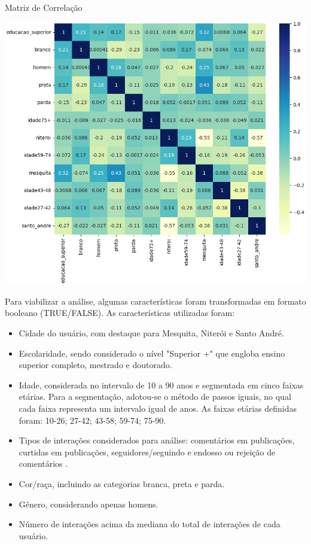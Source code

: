 \begin{quadro}[!htb]
	\caption{Matriz de Correlação}
	\label{fig:colab_correlation_matrix}
	\centering
	\includegraphics[scale=0.6]{images/colab_correlation_matrix.png}
\end{quadro}

Para viabilizar a análise, algumas características foram transformadas em formato booleano (TRUE/FALSE). As características utilizadas foram:

\begin{itemize}
	\item Cidade do usuário, com destaque para Mesquita, Niterói e Santo André.
	\item Escolaridade, sendo considerado o nível "Superior +" que engloba ensino superior completo, mestrado e doutorado.
	\item Idade, considerada no intervalo de 10 a 90 anos e segmentada em cinco faixas etárias. Para a segmentação, adotou-se o método de passos iguais, no qual cada faixa representa um intervalo igual de anos. As faixas etárias definidas foram: 10-26; 27-42; 43-58; 59-74; 75-90.
	\item Tipos de interações considerados para análise: comentários em publicações, curtidas em publicações, seguidores/seguindo e endosso ou rejeição de comentários .
	\item Cor/raça, incluindo as categorias branca, preta e parda.
	\item Gênero, considerando apenas homens.
	\item Número de interações acima da mediana do total de interações de cada usuário.
\end{itemize}

